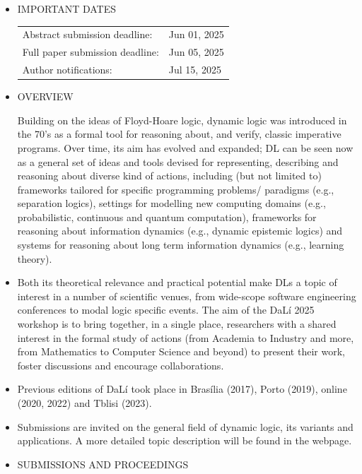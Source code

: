 \documentclass[prodmode,acmtecs]{acmsmall} %
\begin{document}
\begin{itemize}\item  IMPORTANT DATES 
 
\begin{tabulary}{\linewidth}{LL}Abstract submission deadline:  & Jun 01, 2025 \\
Full paper submission deadline:  & Jun 05, 2025 \\
Author notifications:  & Jul 15, 2025 \\
\end{tabulary}
 
\item   OVERVIEW 
 
  Building on the ideas of Floyd-Hoare logic, dynamic logic was introduced in the 70's as a formal tool for reasoning about, and verify, classic imperative programs. Over time, its aim has evolved and expanded; DL can be seen now as a general set of ideas and tools devised for representing, describing and reasoning about diverse kind of actions, including (but not limited to) frameworks tailored for specific programming problems/ paradigms (e.g., separation logics), settings for modelling new computing domains (e.g., probabilistic, continuous and quantum computation), frameworks for reasoning about information dynamics (e.g., dynamic epistemic logics) and systems for reasoning about long term information dynamics (e.g., learning theory). 
 
\item  Both its theoretical relevance and practical potential make DLs a topic of interest in a number of scientific venues, from wide-scope software engineering conferences to modal logic specific events. The aim of the DaLí 2025 workshop is to bring together, in a single place, researchers with a shared interest in the formal study of actions (from Academia to Industry and more, from Mathematics to Computer Science and beyond) to present their work, foster discussions and encourage collaborations. 
 
\item  Previous editions of DaLí took place in Brasília (2017), Porto (2019), online (2020, 2022) and Tblisi (2023). 
 
\item  Submissions are invited on the general field of dynamic logic, its variants and applications. A more detailed topic description will be found in the webpage.  
 
\item  SUBMISSIONS AND PROCEEDINGS 
 

\end{itemize}
\end{document}
